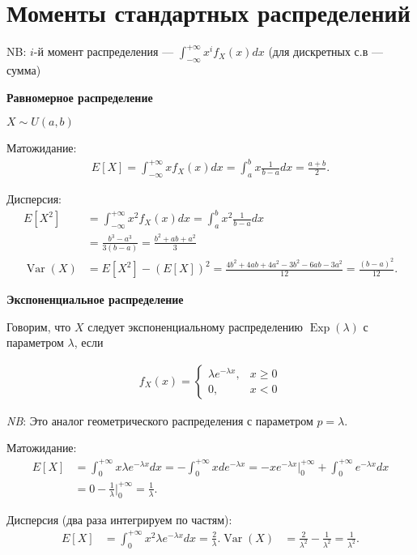 \documentclass[12pt]{article}
\DeclareMathOperator{\Exp}{Exp}
\DeclareMathOperator{\Var}{Var}
\begin{document}
  \section{Моменты стандартных распределений}

  {NB:} $i$-й момент распределения --- $\int_{-\infty}^{+\infty} x^i f_X(x) dx$ (для дискретных с.в --- сумма)

  \textbf{Равномерное распределение}

  $X \sim U(a, b)$ 

  Матожидание:
  \begin{align*}
    E[X] = \int_{-\infty}^{+\infty} x f_X(x) dx = \int_{a}^{b} x \frac{1}{b - a} dx = \frac{a + b}{2}. 
  \end{align*}

  Дисперсия:
  \begin{align*}
    E[X^2] &= \int_{-\infty}^{+\infty} x^2 f_X(x) dx = \int_{a}^{b} x^2 \frac{1}{b - a} dx \\
           &= \frac{b^3 - a^3}{3(b - a)} = \frac{b^2 + ab + a^2}{3}\\
    \Var(X) &= E[X^2] - (E[X])^2 = \frac{4b^2 + 4ab + 4a^2 - 3b^2 - 6ab - 3a^2}{12} = \frac{(b - a)^2}{12}. 
  \end{align*}

  \textbf{Экспоненциальное распределение}

  Говорим, что $X$ следует экспоненциальному распределению $\Exp(\lambda)$ с параметром $\lambda$, если

  \begin{align*}
    f_X(x) = \begin{cases}
      \lambda e^{-\lambda x}, &x \ge 0 \\
      0, &x < 0
    \end{cases}
  \end{align*}

  \emph{NB}: Это аналог геометрического распределения с параметром $p = \lambda$.

  Матожидание:
  \begin{align*}
    E[X] &= \int_0^{+\infty} x \lambda e^{-\lambda x} dx = - \int_0^{+\infty} x d e^{-\lambda x} = - x e^{-\lambda x} \bigg|_0^{+\infty} + \int_0^{+\infty} e^{-\lambda x} dx \\
    &= 0 - \frac{1}{\lambda} \bigg|_0^{+\infty} = \frac{1}{\lambda}.
  \end{align*}

  Дисперсия (два раза интегрируем по частям):
  \begin{align*}
    E[X] &= \int_0^{+\infty} x^2 \lambda e^{-\lambda x} dx = \frac{2}{\lambda}.
    \Var(X) &= \frac{2}{\lambda^2} - \frac{1}{\lambda^2} = \frac{1}{\lambda^2}.
  \end{align*}
\end{document}
